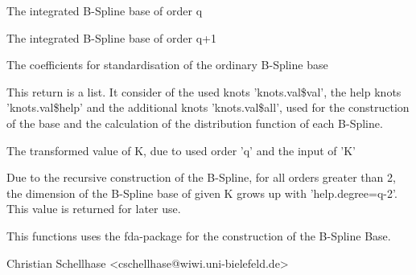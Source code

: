 \begin{Value}
\begin{ldescription}
\item[\code{base.den}] The integrated B-Spline base of order q
\item[\code{base.den2}] The integrated B-Spline base of order q+1
\item[\code{stand.num}] The coefficients for standardisation of the ordinary B-Spline base
\item[\code{knots.val}] This return is a list. It consider of the used knots 'knots.val\$val', the help knots 'knots.val\$help' and the additional knots 'knots.val\$all', used for the construction of the base and the calculation of the distribution function of each B-Spline.
\item[\code{K}] The transformed value of K, due to used order 'q' and the input of 'K'
\item[\code{help.degree}] Due to the recursive construction of the B-Spline, for all orders greater than 2, the dimension of the B-Spline base of given K grows up with 'help.degree=q-2'. This value is returned for later use.
\end{ldescription}
\end{Value}
\begin{Note}\relax
This functions uses the fda-package for the construction of the B-Spline Base.
\end{Note}
\begin{Author}\relax
Christian Schellhase <cschellhase@wiwi.uni-bielefeld.de>
\end{Author}

